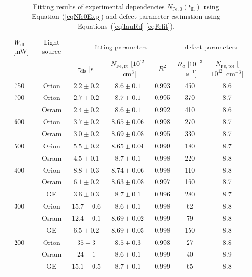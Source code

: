 \documentclass{WileyMSP-template}
\begin{document}
\begin{table}
 \caption{ Fitting results of experimental dependencies $N_\mathrm{Fe,0}(t_\mathrm{ill})$
 using Equation~(\ref{eqNfe0Exp}) and defect parameter estimation using Equations~(\ref{eqTauRd}-\ref{eqFefit}).
}
 \label{tb1}
  \begin{tabular}[htbp]{@{}ccccccc@{}}
    \hline
    $W_\mathrm{ill}$~[mW] & Light source & \multicolumn{3}{c}{fitting parameters}&\multicolumn{2}{c}{defect parameters} \\
     &  & $\tau_\mathrm{dis}$ [s] & $N_\mathrm{Fe,fit}$ [$10^{12}$~cm$^3$] & $R^2$ & $R_d$ [$10^{-3}$~s$^{-1}$] & $N_\mathrm{Fe,tot}$ [$10^{12}$~cm$^{-3}$] \\
    \hline
    750  & Orion  & $2.2\pm0.2$ & $8.6\pm0.1$ & 0.993 &450&8.6\\
    700  & Orion  & $2.7\pm0.2$ & $8.7\pm0.1$ & 0.995 &370&8.7\\
         & Osram  & $2.4\pm0.2$ & $8.6\pm0.1$ & 0.992 &410&8.6\\
    600  & Orion  & $3.7\pm0.2$ & $8.65\pm0.06$ & 0.998&270&8.7 \\
         & Osram  & $3.0\pm0.2$ & $8.69\pm0.08$ & 0.995&330&8.7 \\
    500  & Orion  & $5.5\pm0.2$ & $8.65\pm0.04$ & 0.999&180&8.7 \\
         & Osram  & $4.5\pm0.1$ & $8.7\pm0.1$ & 0.998&220&8.8 \\
    400  & Orion  & $8.8\pm0.3$ & $8.74\pm0.06$ & 0.998&110&8.8 \\
         & Osram  & $6.1\pm0.2$ & $8.63\pm0.08$ & 0.997 &160&8.7\\
         & GE  & $3.6\pm0.3$ & $8.7\pm0.1$ & 0.996 &280&8.7\\
    300  & Orion  & $15.7\pm0.6$ & $8.6\pm0.1$ & 0.998 &62&8.8\\
         & Osram  & $12.4\pm0.1$ & $8.69\pm0.02$ & 0.999&79&8.8 \\
         & GE  & $6.5\pm0.2$ & $8.69\pm0.05$ & 0.998 &150&8.8\\
    200  & Orion  & $35\pm3$ & $8.5\pm0.3$ & 0.998 &27&8.8\\
         & Osram  & $24\pm1$ & $8.6\pm0.1$ & 0.999 &40&8.9\\
         & GE  & $15.1\pm0.5$ & $8.7\pm0.1$ & 0.999 &65&8.8\\
    \hline
  \end{tabular}
\end{table}
\end{document}
